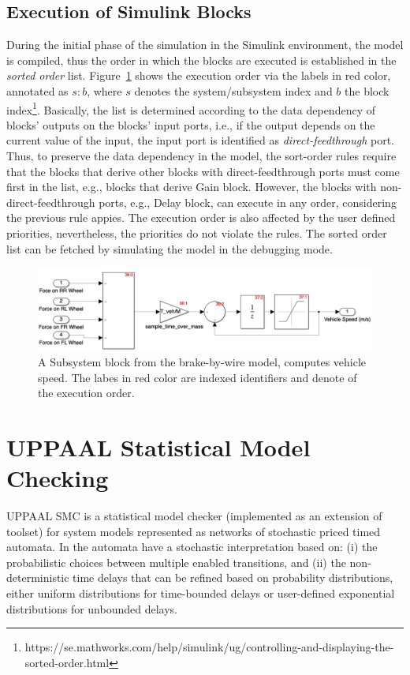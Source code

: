 \subsection*{Execution of Simulink Blocks}
During the initial phase of the simulation in the Simulink environment, the model is compiled, thus the order in which the blocks are executed is established in the \textit{sorted order} list. Figure~\ref{fig_sm_exec_order} shows the execution order via the labels in red color, annotated as $s:b$, where $s$ denotes the system/subsystem index and $b$ the block index\footnote{https://se.mathworks.com/help/simulink/ug/controlling-and-displaying-the-sorted-order.html}. Basically, the list is determined according to the data dependency of blocks' outputs on the blocks' input ports, i.e., if the output depends on the current value of the input, the input port is identified as \textit{direct-feedthrough} port. Thus, to preserve the data dependency in the model, the sort-order rules require that the blocks that derive other blocks with direct-feedthrough ports must come first in the list, e.g., blocks that derive Gain block. However, the blocks with non-direct-feedthrough ports, e.g., Delay block, can execute in any order, considering the previous rule appies. The execution order is also affected by the user defined priorities, nevertheless, the priorities do not violate the rules. The sorted order list can be fetched by simulating the model in the debugging mode.
\begin{figure}
	\centering
	\includegraphics[width=1\linewidth]{images/sm_exec_order}
	\caption{A Subsystem block from the brake-by-wire model, computes vehicle speed. The labes in red color are indexed identifiers and denote of the execution order.}
	\label{fig_sm_exec_order}
\end{figure}

\section{UPPAAL Statistical Model Checking}
UPPAAL SMC \cite{david2012statistical} is a statistical model checker (implemented as an extension of \uppaal{} toolset) for system models represented as networks of stochastic priced timed automata. In \uppaalsmc{} the automata have a stochastic interpretation based on: (i) the probabilistic choices between multiple enabled transitions, and (ii) the non-deterministic time delays that can be refined based on probability distributions, either uniform distributions for time-bounded delays or user-defined exponential distributions for unbounded delays.

